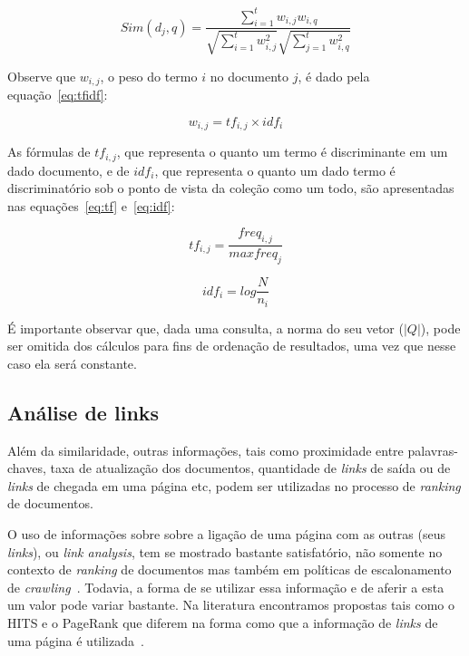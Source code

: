 \documentclass[10pt,twocolumn]{article}
\begin{document}
\begin{equation}
Sim(d_{j},q) = \frac{\sum_{i = 1}^{t}w_{i,j} w_{i,q}}{\sqrt{\sum_{i =
1}^{t}w_{i,j}^{2}} \sqrt{\sum_{j = 1}^{t}w_{i,q}^{2}}}
\label{eq:sim}
\end{equation}

Observe que \(w_{i,j}\), o peso do termo \(i\) no documento \(j\), é
dado pela equação~\ref{eq:tfidf}:


\begin{equation}
w_{i,j} = tf_{i,j}\times idf_{i}
\label{eq:tfidf}
\end{equation}

As fórmulas de \(tf_{i,j}\), que representa o quanto um termo é
discriminante em um dado documento, e de \(idf_{i}\), que representa o
quanto um dado termo é discriminatório sob o ponto de vista da coleção
como um todo, são apresentadas nas equações~\ref{eq:tf} e~\ref{eq:idf}:

\begin{equation}
tf_{i,j} = \frac{freq_{i,j}}{max freq_{j}}
\label{eq:tf}
\end{equation}

\begin{equation}
idf_{i} = log\frac{N}{n_{i}}
\label{eq:idf}
\end{equation}

É importante observar que, dada uma consulta, a norma do seu vetor
(\(|Q|\)), pode ser omitida dos cálculos para fins de ordenação de
resultados, uma vez que nesse caso ela será constante.

\subsection{Análise de links}

Além da similaridade, outras informações, tais como
proximidade entre palavras-chaves, taxa de atualização dos documentos,
 quantidade de \emph{links} de saída ou de \emph{links} de chegada em uma página
etc, podem ser utilizadas no processo de \emph{ranking} de documentos.

O uso de informações sobre sobre a ligação de uma página com as outras
(seus \emph{links}), ou \emph{link analysis}, tem se mostrado bastante
satisfatório, não somente no contexto de \emph{ranking} de documentos
mas também em políticas de escalonamento de
\emph{crawling}~\cite{baezayates2005crawling}. Todavia, a forma de se
utilizar essa informação e de aferir a esta um valor pode variar
bastante. Na literatura encontramos propostas tais como o HITS e o
PageRank que diferem na forma como que a informação de \emph{links} de
uma página é utilizada~\cite{page98pagerank}.
\end{document}

